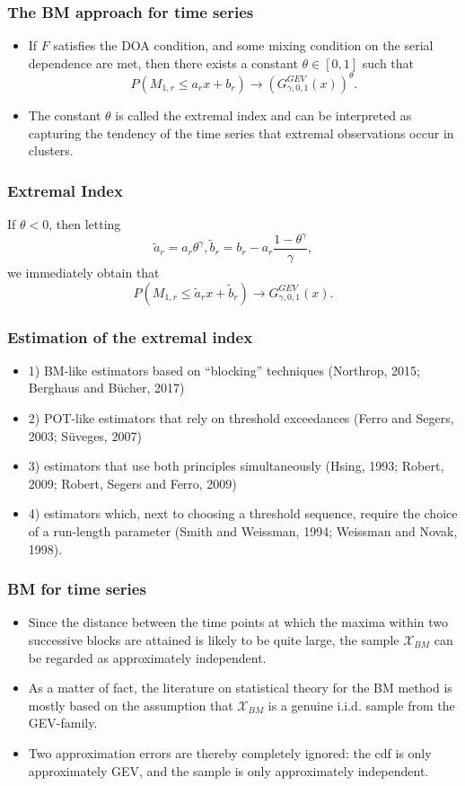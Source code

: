 \documentclass{beamer}
\newcommand{\suit}[1]{\left(#1\right)}
\begin{document}
\begin{frame}
    \frametitle{The BM approach for time series}
\begin{itemize}
    \item   If $F$ satisfies the DOA condition, and some mixing condition on the serial dependence are met, then there exists a constant $\theta \in[0,1]$ such that
    $$
    P\suit{M_{1,r}\le a_r x+b_r}\to\suit{G^{GEV}_{\gamma,0,1}(x)}^{\theta}.
    $$
     \item The constant $\theta$ is called the extremal index and can be interpreted as capturing the tendency of the time series that extremal observations occur in clusters.
\end{itemize}
    

\end{frame}


\begin{frame}
    \frametitle{Extremal Index}
If $\theta<0$, then letting
$$
\tilde{a}_r =a_r\theta^{\gamma}, \tilde{b}_r=b_r-a_r\frac{1-\theta^{\gamma}}{\gamma},
$$
we immediately obtain that
$$
P\suit{M_{1,r}\le \tilde{a}_r x+\tilde{b}_r}\to G^{GEV}_{\gamma,0,1}(x).
$$
\end{frame}

\begin{frame}
    \frametitle{Estimation of the extremal index}
\begin{itemize}
    \item 1) BM-like estimators based on “blocking”
    techniques (Northrop, 2015; Berghaus and Bücher, 2017)
    \item 2) POT-like estimators that rely on
    threshold exceedances (Ferro and Segers, 2003; Süveges, 2007)
    \item  3) estimators that use both principles simultaneously (Hsing, 1993; Robert, 2009; Robert, Segers and Ferro, 2009)
    \item 4) estimators which, next to choosing a threshold sequence, require the choice of a run-length parameter
    (Smith and Weissman, 1994; Weissman and Novak, 1998).
\end{itemize}
\end{frame}


\begin{frame}
    \frametitle{BM for time series}
\begin{itemize}
    \item Since the distance between the time points at which the maxima within two successive blocks
    are attained is likely to be quite large, the sample $\mathcal{X}_{BM}$ can be regarded as approximately independent.
    \item As a matter of fact, the literature on statistical theory for the BM method is mostly
    based on the assumption that $\mathcal{X}_{BM}$ is a genuine i.i.d. sample from the GEV-family.
    \item Two approximation errors are thereby completely ignored: the cdf is only approximately
    GEV, and the sample is only approximately independent.
\end{itemize}
    

\end{frame}
\end{document}
